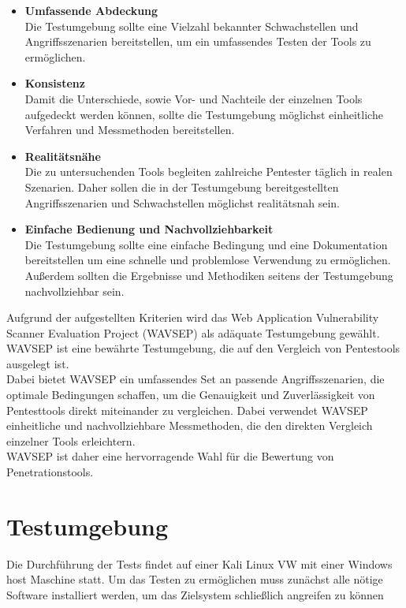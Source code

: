 \begin{itemize}
	\item \textbf{Umfassende Abdeckung} \\
	Die Testumgebung sollte eine Vielzahl bekannter Schwachstellen und Angriffsszenarien bereitstellen, um ein umfassendes Testen der Tools zu ermöglichen.
	\item \textbf{Konsistenz} \\
	Damit die Unterschiede, sowie Vor- und Nachteile der einzelnen Tools aufgedeckt werden können, sollte die Testumgebung möglichst einheitliche Verfahren und Messmethoden bereitstellen.
	\item \textbf{Realitätsnähe} \\
	Die zu untersuchenden Tools begleiten zahlreiche Pentester täglich in realen Szenarien.
	Daher sollen die in der Testumgebung bereitgestellten Angriffsszenarien und Schwachstellen möglichst realitätsnah sein. 
	\item \textbf{Einfache Bedienung und Nachvollziehbarkeit} \\
	Die Testumgebung sollte eine einfache Bedingung und eine Dokumentation bereitstellen um eine schnelle und problemlose Verwendung zu ermöglichen.
	Außerdem sollten die Ergebnisse und Methodiken seitens der Testumgebung nachvollziehbar sein.
\end{itemize}

Aufgrund der aufgestellten Kriterien wird das Web Application Vulnerability Scanner Evaluation Project (WAVSEP) als adäquate Testumgebung gewählt. WAVSEP ist eine bewährte Testumgebung, die auf den Vergleich von Pentestools ausgelegt ist.  \\
Dabei bietet WAVSEP ein umfassendes Set an passende Angriffsszenarien, die optimale Bedingungen schaffen, um die Genauigkeit und Zuverlässigkeit von Pentesttools direkt miteinander zu vergleichen.
Dabei verwendet WAVSEP einheitliche und nachvollziehbare Messmethoden, die den direkten Vergleich einzelner Tools erleichtern. \\
WAVSEP ist daher eine hervorragende Wahl für die Bewertung von Penetrationstools.

\section{Testumgebung}
Die Durchführung der Tests findet auf einer Kali Linux VW mit einer Windows host Maschine statt. 
Um das Testen zu ermöglichen muss zunächst alle nötige Software installiert werden, um das Zielsystem schließlich angreifen zu können


